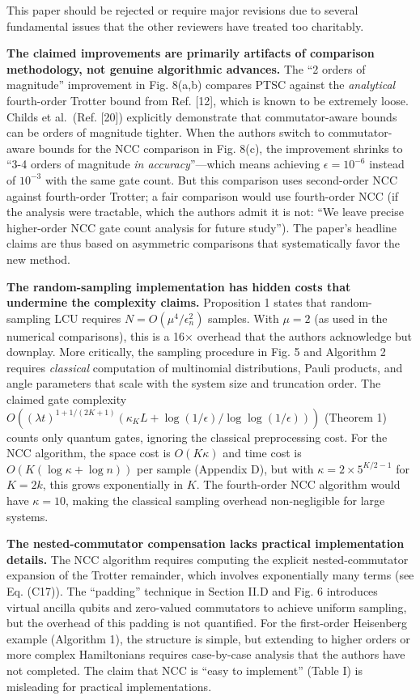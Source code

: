 \documentclass[10pt,letterpaper]{article}
\begin{document}
This paper should be rejected or require major revisions due to several fundamental issues that the other reviewers have treated too charitably.

\textbf{The claimed improvements are primarily artifacts of comparison methodology, not genuine algorithmic advances.} The ``2 orders of magnitude'' improvement in Fig. 8(a,b) compares PTSC against the \emph{analytical} fourth-order Trotter bound from Ref. {[}12{]}, which is known to be extremely loose. Childs et al.~(Ref. {[}20{]}) explicitly demonstrate that commutator-aware bounds can be orders of magnitude tighter. When the authors switch to commutator-aware bounds for the NCC comparison in Fig. 8(c), the improvement shrinks to ``3-4 orders of magnitude \emph{in accuracy}''---which means achieving \(\epsilon = 10^{-6}\) instead of \(10^{-3}\) with the same gate count. But this comparison uses second-order NCC against fourth-order Trotter; a fair comparison would use fourth-order NCC (if the analysis were tractable, which the authors admit it is not: ``We leave precise higher-order NCC gate count analysis for future study''). The paper's headline claims are thus based on asymmetric comparisons that systematically favor the new method.

\textbf{The random-sampling implementation has hidden costs that undermine the complexity claims.} Proposition 1 states that random-sampling LCU requires \(N = O(\mu^4/\epsilon_n^2)\) samples. With \(\mu = 2\) (as used in the numerical comparisons), this is a 16× overhead that the authors acknowledge but downplay. More critically, the sampling procedure in Fig. 5 and Algorithm 2 requires \emph{classical} computation of multinomial distributions, Pauli products, and angle parameters that scale with the system size and truncation order. The claimed gate complexity \(O((λt)^{1+1/(2K+1)}(\kappa_K L + \log(1/\epsilon)/\log\log(1/\epsilon)))\) (Theorem 1) counts only quantum gates, ignoring the classical preprocessing cost. For the NCC algorithm, the space cost is \(O(K\kappa)\) and time cost is \(O(K(\log\kappa + \log n))\) per sample (Appendix D), but with \(\kappa = 2 \times 5^{K/2-1}\) for \(K = 2k\), this grows exponentially in \(K\). The fourth-order NCC algorithm would have \(\kappa = 10\), making the classical sampling overhead non-negligible for large systems.

\textbf{The nested-commutator compensation lacks practical implementation details.} The NCC algorithm requires computing the explicit nested-commutator expansion of the Trotter remainder, which involves exponentially many terms (see Eq. (C17)). The ``padding'' technique in Section II.D and Fig. 6 introduces virtual ancilla qubits and zero-valued commutators to achieve uniform sampling, but the overhead of this padding is not quantified. For the first-order Heisenberg example (Algorithm 1), the structure is simple, but extending to higher orders or more complex Hamiltonians requires case-by-case analysis that the authors have not completed. The claim that NCC is ``easy to implement'' (Table I) is misleading for practical implementations.
\end{document}
